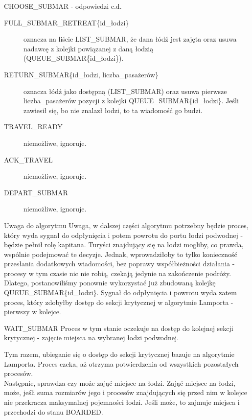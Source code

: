 \documentclass{beamer}
\begin{document}
\begin{frame}{CHOOSE\_SUBMAR - odpowiedzi c.d.}
    \internallinenumbers
    \resetlinenumber[1]
    \begin{description}
        \item [FULL\_SUBMAR\_RETREAT\{id\_łodzi\}] oznacza na liście LIST\_SUBMAR, że dana łódź jest zajęta oraz usuwa nadawcę z kolejki powiązanej z daną łodzią (QUEUE\_SUBMAR\{id\_łodzi\}).
        \item [RETURN\_SUBMAR\{id\_łodzi, liczba\_pasażerów\}] oznacza łódź jako dostępną (LIST\_SUBMAR) oraz usuwa pierwsze liczba\_pasażerów pozycji z kolejki QUEUE\_SUBMAR\{id\_łodzi\}. Jeśli zawiesił się, bo nie znalazł łodzi, to ta wiadomość go budzi.
        \item [TRAVEL\_READY] niemożliwe, ignoruje.
        \item [ACK\_TRAVEL] niemożliwe, ignoruje.
        \item [DEPART\_SUBMAR] niemożliwe, ignoruje.
    \end{description}
\end{frame}


\begin{frame}{Uwaga do algorytmu}
    \internallinenumbers
    \resetlinenumber[1]
    Uwaga, w dalszej części algorytmu potrzebny będzie proces, który wyda sygnał do odpłynięcia i potem powrotu do portu łodzi podwodnej - będzie pełnił rolę kapitana. Turyści znajdujący się na łodzi mogliby, co prawda, wspólnie podejmować te decyzje. Jednak, wprowadziłoby to tylko konieczność przesłania dodatkowych wiadomości, bez poprawy współbieżności działania - procesy w tym czasie nic nie robią, czekają jedynie na zakończenie podróży. Dlatego, postanowiliśmy ponownie wykorzystać już zbudowaną kolejkę QUEUE\_SUBMAR\{id\_łodzi\}. Sygnał do odpłynięcia i powrotu wyda zatem proces, który zdobyłby dostęp do sekcji krytycznej w algorytmie Lamporta - pierwszy w kolejce.
\end{frame}

\begin{frame}{WAIT\_SUBMAR}
    \internallinenumbers
    \resetlinenumber[1]
    Proces w tym stanie oczekuje na dostęp do kolejnej sekcji krytycznej - zajęcie miejsca na wybranej łodzi podwodnej.

    \vspace{0.4cm}
    Tym razem, ubieganie się o dostęp do sekcji krytycznej bazuje na algorytmie Lamporta. Proces czeka, aż otrzyma potwierdzenia od wszystkich pozostałych procesów. \\
    Następnie, sprawdza czy może zająć miejsce na łodzi. Zająć miejsce na łodzi, może, jeśli suma rozmiarów jego i procesów znajdujących się przed nim w kolejce nie przekracza maksymalnej pojemności łodzi. Jeśli może, to zajmuje miejsca i przechodzi do stanu BOARDED.
\end{frame}
\end{document}

